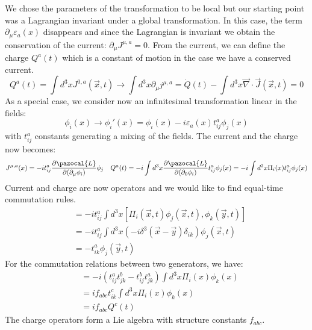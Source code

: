 \documentclass[../main.tex]{subfiles}
\begin{document}
We chose the parameters of the transformation to be local but our starting point was a Lagrangian invariant under a global transformation. In this case, the term $\partial_\mu\varepsilon_a(x)$ disappears and since the Lagrangian is invariant we obtain the conservation of the current: $\partial_\mu J^{\mu,a}=0$. From the current, we can define the charge $Q^a(t)$ which is a constant of motion in the case we have a conserved current.
\[
Q^a(t)=\int d^3xJ^{0,a}(\Vec{x},t)\to\int d^3x\partial_\mu j^{\mu,a}=\Dot{Q}(t)-\int d^3x\Vec{\nabla}\cdot\Vec{J}(\Vec{x},t)=0
\]
As a special case, we consider now an infinitesimal transformation linear in the fields:
\[
\phi_i(x)\to\phi_i'(x)=\phi_i(x)-i\varepsilon_a(x)t_{ij}^a\phi_j(x)
\]
with $t_{ij}^a$ constants generating a mixing of the fields. The current and the charge now becomes:
\[
J^{\mu,a}(x)=-it_{ij}^a\frac{\partial\pazocal{L}}{\partial(\partial_\mu\phi_i)}\phi_j \quad Q^a(t)=-i\int d^3x\frac{\partial\pazocal{L}}{\partial(\partial_0\phi_i)}t_{ij}^a\phi_j(x)=-i\int d^3x\Pi_i(x)t_{ij}^a\phi_j(x)
\]
Current and charge are now operators and we would like to find equal-time commutation rules. 
\begin{align*}
[Q^a(t),\phi_k(\Vec{y},t)]&=-it_{ij}^a\int d^3x[\Pi_i(\Vec{x},t)\phi_j(\Vec{x},t),\phi_k(\Vec{y},t)]\\
&=-it_{ij}^a\int d^3x\left(-i\delta^3(\Vec{x}-\Vec{y})\delta_{ik}\right)\phi_j(\Vec{x},t)\\
&=-t_{ik}^a\phi_j(\Vec{y},t)
\end{align*}
For the commutation relations between two generators, we have:
\begin{align*}
[Q^a(t),Q^b(t)]&=-i\left(t_{ij}^at_{jk}^b-t_{ij}^bt_{jk}^a\right)\int d^3x\Pi_i(x)\phi_k(x)\\
&=if_{abc}t_{ik}^c\int d^3x\Pi_i(x)\phi_k(x)\\
&=if_{abc}Q^c(t)
\end{align*}
The charge operators form a Lie algebra with structure constants $f_{abc}$. 
\end{document}
